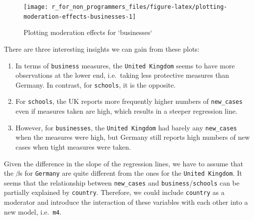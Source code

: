 \documentclass[
]{book}
\providecommand{\tightlist}{%
  \setlength{\itemsep}{0pt}\setlength{\parskip}{0pt}}
\begin{document}
\begin{figure}

{\centering \texttt{[image: r\_for\_non\_programmers\_files/figure-latex/plotting-moderation-effects-businesses-1]} 

}

\caption{Plotting moderation effects for `businesses`}\label{fig:plotting-moderation-effects-businesses}
\end{figure}

There are three interesting insights we can gain from these plots:

\begin{enumerate}
\def\labelenumi{\arabic{enumi}.}
\tightlist
\item
  In terms of \texttt{business} measures, the \texttt{United\ Kingdom} seems to have more observations at the lower end, i.e.~taking less protective measures than Germany. In contrast, for \texttt{schools}, it is the opposite.
\item
  For \texttt{schools}, the UK reports more frequently higher numbers of \texttt{new\_cases} even if measures taken are high, which results in a steeper regression line.
\item
  However, for \texttt{businesses}, the \texttt{United\ Kingdom} had barely any \texttt{new\_cases} when the measures were high, but Germany still reports high numbers of new cases when tight measures were taken.
\end{enumerate}

Given the difference in the slope of the regression lines, we have to assume that the \(\beta\)s for \texttt{Germany} are quite different from the ones for the \texttt{United\ Kingdom}. It seems that the relationship between \texttt{new\_cases} and \texttt{business}/\texttt{schools} can be partially explained by \texttt{country}. Therefore, we could include \texttt{country} as a moderator and introduce the interaction of these variables with each other into a new model, i.e.~\texttt{m4}.
\end{document}
